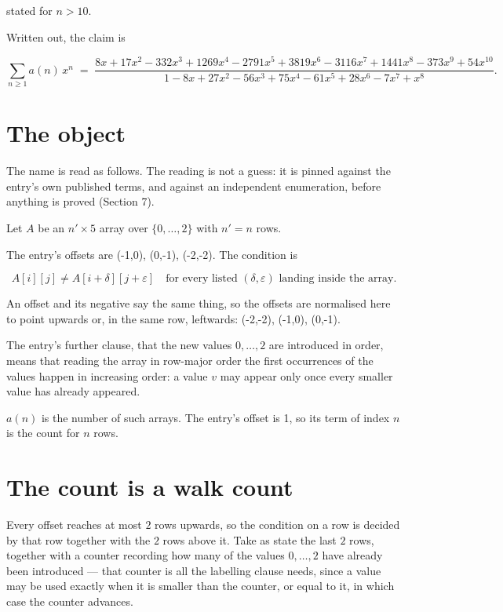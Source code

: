 \documentclass[11pt]{article}
\theoremstyle{definition}
\begin{document}
stated for $n > 10$.

Written out, the claim is

\[\sum_{n \ge 1} a(n)\,x^n \;=\; \frac{8x + 17x^{2} - 332x^{3} + 1269x^{4} - 2791x^{5} + 3819x^{6} - 3116x^{7} + 1441x^{8} - 373x^{9} + 54x^{10}}{1 - 8x + 27x^{2} - 56x^{3} + 75x^{4} - 61x^{5} + 28x^{6} - 7x^{7} + x^{8}}.\]

\section{The object}

The name is read as follows. The reading is not a guess: it is pinned against the entry's own published terms, and against an independent enumeration, before anything is proved (Section 7).

Let $A$ be an $n' \times 5$ array over $\{0,\dots,2\}$ with $n' = n$ rows.

The entry's offsets are (-1,0), (0,-1), (-2,-2). The condition is

\[A[i][j] \ne A[i{+}\delta][j{+}\varepsilon]\quad\text{for every listed }(\delta,\varepsilon)\text{ landing inside the array.}\]

An offset and its negative say the same thing, so the offsets are normalised here to point upwards or, in the same row, leftwards: (-2,-2), (-1,0), (0,-1).

The entry's further clause, that the new values $0,\dots,2$ are introduced in order, means that reading the array in row-major order the first occurrences of the values happen in increasing order: a value $v$ may appear only once every smaller value has already appeared.

$a(n)$ is the number of such arrays. The entry's offset is 1, so its term of index $n$ is the count for $n$ rows.

\section{The count is a walk count}

Every offset reaches at most $2$ rows upwards, so the condition on a row is decided by that row together with the $2$ rows above it. Take as state the last $2$ rows, together with a counter recording how many of the values $0,\dots,2$ have already been introduced --- that counter is all the labelling clause needs, since a value may be used exactly when it is smaller than the counter, or equal to it, in which case the counter advances.
\end{document}
